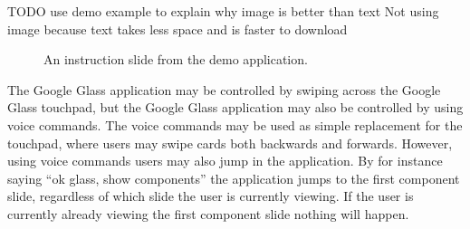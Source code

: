 TODO use demo example to explain why image is better than text Not using image because text takes less space and is faster to download

	\begin{figure}[ht!]
		\centering
   		 \qquad
   		 \qquad
		\caption{An instruction slide from the demo application.}
		\label{glassDemoInstructionImage}
	\end{figure}
	
The Google Glass application may be controlled by swiping across the Google Glass touchpad, but the Google Glass application may also be controlled by using voice commands. The voice commands may be used as simple replacement for the touchpad, where users may swipe cards both backwards and forwards. However, using voice commands users may also jump in the application. By for instance saying ``ok glass, show components'' the application jumps to the first component slide, regardless of which slide the user is currently viewing. If the user is currently already viewing the first component slide nothing will happen.
	
